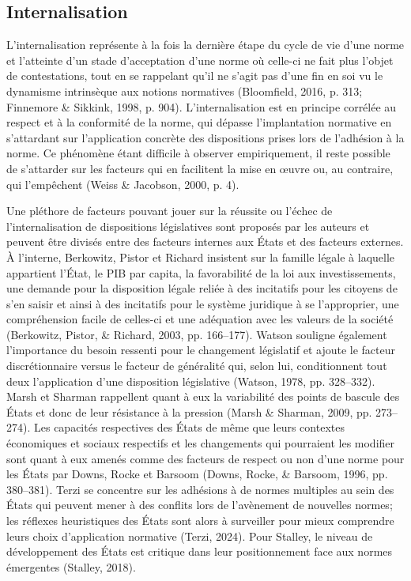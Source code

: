 \documentclass[12pt]{ulaval}
\begin{document}
\subsection{Internalisation}\label{internalisation}

L'internalisation représente à la fois la dernière étape du cycle de vie d'une norme et l'atteinte d'un stade d'acceptation d'une norme où celle-ci ne fait plus l'objet de contestations, tout en se rappelant qu'il ne s'agit pas d'une fin en soi vu le dynamisme intrinsèque aux notions normatives (Bloomfield, 2016, p. 313; Finnemore \& Sikkink, 1998, p. 904). L'internalisation est en principe corrélée au respect et à la conformité de la norme, qui dépasse l'implantation normative en s'attardant sur l'application concrète des dispositions prises lors de l'adhésion à la norme. Ce phénomène étant difficile à observer empiriquement, il reste possible de s'attarder sur les facteurs qui en facilitent la mise en œuvre ou, au contraire, qui l'empêchent (Weiss \& Jacobson, 2000, p. 4).

Une pléthore de facteurs pouvant jouer sur la réussite ou l'échec de l'internalisation de dispositions législatives sont proposés par les auteurs et peuvent être divisés entre des facteurs internes aux États et des facteurs externes. À l'interne, Berkowitz, Pistor et Richard insistent sur la famille légale à laquelle appartient l'État, le PIB par capita, la favorabilité de la loi aux investissements, une demande pour la disposition légale reliée à des incitatifs pour les citoyens de s'en saisir et ainsi à des incitatifs pour le système juridique à se l'approprier, une compréhension facile de celles-ci et une adéquation avec les valeurs de la société (Berkowitz, Pistor, \& Richard, 2003, pp. 166--177). Watson souligne également l'importance du besoin ressenti pour le changement législatif et ajoute le facteur discrétionnaire versus le facteur de généralité qui, selon lui, conditionnent tout deux l'application d'une disposition législative (Watson, 1978, pp. 328--332). Marsh et Sharman rappellent quant à eux la variabilité des points de bascule des États et donc de leur résistance à la pression (Marsh \& Sharman, 2009, pp. 273--274). Les capacités respectives des États de même que leurs contextes économiques et sociaux respectifs et les changements qui pourraient les modifier sont quant à eux amenés comme des facteurs de respect ou non d'une norme pour les États par Downs, Rocke et Barsoom (Downs, Rocke, \& Barsoom, 1996, pp. 380--381). Terzi se concentre sur les adhésions à de normes multiples au sein des États qui peuvent mener à des conflits lors de l'avènement de nouvelles normes; les réflexes heuristiques des États sont alors à surveiller pour mieux comprendre leurs choix d'application normative (Terzi, 2024). Pour Stalley, le niveau de développement des États est critique dans leur positionnement face aux normes émergentes (Stalley, 2018).
\end{document}
